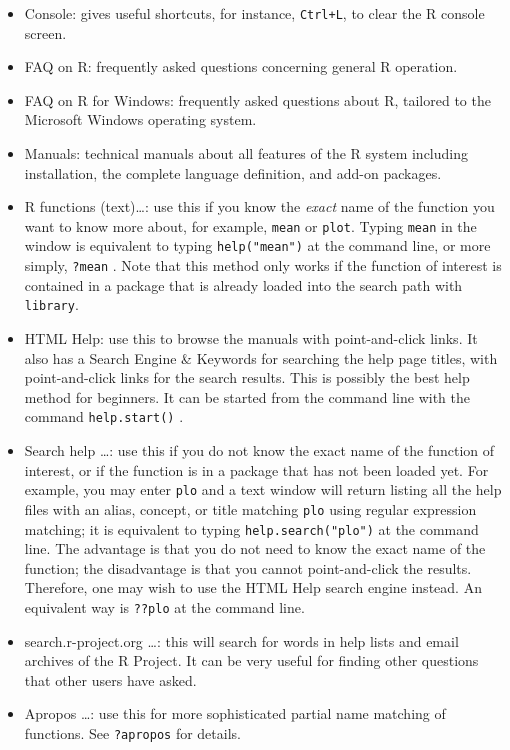 \documentclass[]{book}
\providecommand{\tightlist}{%
  \setlength{\itemsep}{0pt}\setlength{\parskip}{0pt}}
\numberwithin{equation}{chapter}
\numberwithin{figure}{chapter}
\theoremstyle{plain}
\theoremstyle{definition}
\theoremstyle{remark}
\theoremstyle{definition}
\theoremstyle{definition}
\theoremstyle{remark}
\begin{document}
\begin{itemize}
\tightlist
\item
  Console: gives useful shortcuts, for instance, \texttt{Ctrl+L}, to
  clear the R console screen.
\item
  FAQ on R: frequently asked questions concerning general R operation.
\item
  FAQ on R for Windows: frequently asked questions about R, tailored to
  the Microsoft Windows operating system.
\item
  Manuals: technical manuals about all features of the R system
  including installation, the complete language definition, and add-on
  packages.
\item
  R functions (text)\ldots{}: use this if you know the \emph{exact} name
  of the function you want to know more about, for example,
  \texttt{mean} or \texttt{plot}. Typing \texttt{mean} in the window is
  equivalent to typing \texttt{help("mean")} 
  at the command line, or more simply, \texttt{?mean}
  . Note that this method only works if the function
  of interest is contained in a package that is already loaded into the
  search path with \texttt{library}.
\item
  HTML Help: use this to browse the manuals with point-and-click links.
  It also has a Search Engine \& Keywords for searching the help page
  titles, with point-and-click links for the search results. This is
  possibly the best help method for beginners. It can be started from
  the command line with the command \texttt{help.start()}
  .
\item
  Search help \ldots{}: use this if you do not know the exact name of
  the function of interest, or if the function is in a package that has
  not been loaded yet. For example, you may enter \texttt{plo} and a
  text window will return listing all the help files with an alias,
  concept, or title matching \texttt{plo} using regular expression
  matching; it is equivalent to typing \texttt{help.search("plo")}
   at the command line. The
  advantage is that you do not need to know the exact name of the
  function; the disadvantage is that you cannot point-and-click the
  results. Therefore, one may wish to use the HTML Help search engine
  instead. An equivalent way is \texttt{??plo}  at
  the command line.
\item
  search.r-project.org \ldots{}: this will search for words in help
  lists and email archives of the R Project. It can be very useful for
  finding other questions that other users have asked.
\item
  Apropos \ldots{}: use this for more sophisticated partial name
  matching of functions. See \texttt{?apropos}
   for details.
\end{itemize}
\end{document}
